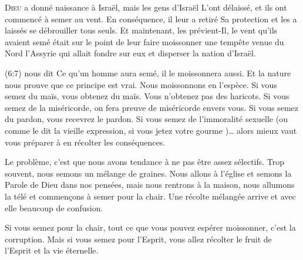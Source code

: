 

\lettrine{D}{ieu} a donné naissance à Israël, mais les gens d'Israël
 L'ont délaissé, et ils ont commencé à semer au vent.
 En conséquence, il leur a retiré Sa protection et les a laissés 
 se débrouiller tous seuls. Et maintenant, les prévient-Il,
 le vent qu'ils avaient semé était sur le point de leur faire moissonner
 une tempête venue du Nord
 \ocadr l'Assyrie qui allait fondre sur eux et disperser la nation d'Israël. 


(6:7) nous dit\frcolon{} 
 \Og Ce qu'un homme aura semé, il le moissonnera aussi. \Fg{}
 Et la nature nous prouve que ce principe est vrai.
 Nous moissonnons en l'espèce. Si vous semez du maïs, vous obtenez du maïs.
 Vous n'obtenez pas des haricots. Si vous semez de la miséricorde,
 on fera preuve de miséricorde envers vous. Si vous semez du pardon,
 vous recevrez le pardon. Si vous semez de l'immoralité sexuelle
 (ou comme le dit la vieille expression,
 \Og si vous jetez votre gourme \Fg{})\dots{}
 alors mieux vaut vous préparer à en récolter les conséquences. 

Le problème, c'est que nous avons tendance à ne pas être assez sélectifs.
 Trop souvent, nous semons un mélange de graines.
 Nous allons à l'église et semons la Parole de Dieu dans nos pensées,
 mais nous rentrons à la maison, nous allumons la télé et commen\c{c}ons à semer
 pour la chair. Une récolte mélangée arrive et avec elle beaucoup de confusion. 

Si vous semez pour la chair, tout ce que vous pouvez espérer moissonner,
 c'est la corruption. Mais si vous semez pour l'Esprit,
 vous allez récolter le fruit de l'Esprit et la vie éternelle. 

\dvrule




